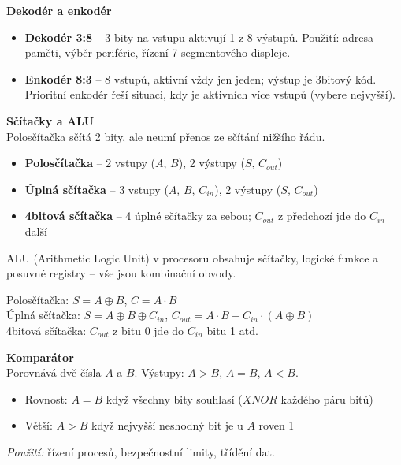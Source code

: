 \documentclass[a4paper,10pt]{article}
\begin{document}
\begin{vysvetlenibox}
\textbf{Dekodér a enkodér}\\
\begin{itemize}[noitemsep, leftmargin=1.4em, topsep=4pt]
    \item \textbf{Dekodér 3:8} -- 3 bity na vstupu aktivují 1 z 8 výstupů.
          Použití: adresa paměti, výběr periférie, řízení 7-segmentového displeje.
    \item \textbf{Enkodér 8:3} -- 8 vstupů, aktivní vždy jen jeden; výstup je 3bitový kód.
          Prioritní enkodér řeší situaci, kdy je aktivních více vstupů (vybere nejvyšší).
\end{itemize}

\textbf{Sčítačky a ALU}\\
Polosčítačka sčítá 2 bity, ale neumí přenos ze sčítání nižšího řádu.
\begin{itemize}[noitemsep, leftmargin=1.4em, topsep=4pt]
    \item \textbf{Polosčítačka} -- 2 vstupy ($A$, $B$), 2 výstupy ($S$, $C_{out}$)
    \item \textbf{Úplná sčítačka} -- 3 vstupy ($A$, $B$, $C_{in}$), 2 výstupy ($S$, $C_{out}$)
    \item \textbf{4bitová sčítačka} -- 4 úplné sčítačky za sebou; $C_{out}$ z předchozí jde do $C_{in}$ další
\end{itemize}
ALU (Arithmetic Logic Unit) v procesoru obsahuje sčítačky, logické funkce
a posuvné registry -- vše jsou kombinační obvody.

\begin{vzorcebox}
Polosčítačka: $S = A \oplus B$, \quad $C = A \cdot B$\\
Úplná sčítačka: $S = A \oplus B \oplus C_{in}$, \quad
$C_{out} = A \cdot B + C_{in} \cdot (A \oplus B)$\\
4bitová sčítačka: $C_{out}$ z bitu 0 jde do $C_{in}$ bitu 1 atd.
\end{vzorcebox}

\textbf{Komparátor}\\
Porovnává dvě čísla $A$ a $B$. Výstupy: $A>B$, $A=B$, $A<B$.
\begin{itemize}[noitemsep, leftmargin=1.4em, topsep=4pt]
    \item Rovnost: $A=B$ když všechny bity souhlasí ($XNOR$ každého páru bitů)
    \item Větší: $A>B$ když nejvyšší neshodný bit je u $A$ roven 1
\end{itemize}
\textit{Použití:} řízení procesů, bezpečnostní limity, třídění dat.
\end{vysvetlenibox}
\end{document}
